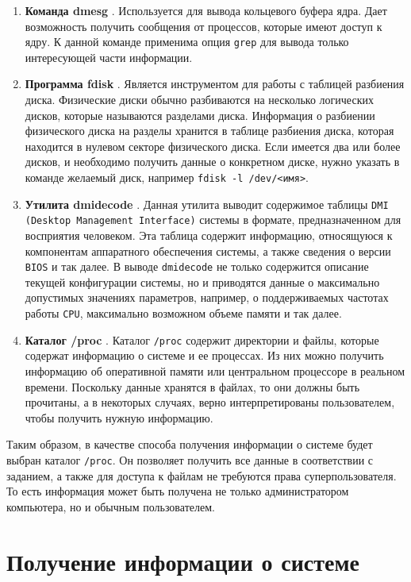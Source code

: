 \begin{enumerate}
    \item \textbf{Команда dmesg} \cite{dmesg}. Используется для вывода кольцевого буфера ядра. Дает возможность получить сообщения от процессов, которые имеют доступ к ядру. К данной команде применима опция \texttt{grep} для вывода только интересующей части информации.
    \item \textbf{Программа fdisk} \cite{fdisk}. Является инструментом для работы с таблицей разбиения диска. Физические диски обычно разбиваются на несколько логических дисков, которые называются разделами диска. Информация о разбиении физического диска на разделы хранится в таблице разбиения диска, которая находится в нулевом секторе физического диска. Если имеется два или более дисков, и необходимо получить данные о конкретном диске, нужно указать в команде желаемый диск, например \texttt{fdisk -l /dev/<имя>}.
    \item \textbf{Утилита dmidecode} \cite{dmidecode}. Данная утилита выводит содержимое таблицы \texttt{DMI (Desktop Management Interface)} системы в формате, предназначенном для восприятия человеком. Эта таблица содержит информацию, относящуюся к компонентам аппаратного обеспечения системы, а также сведения о версии \texttt{BIOS} и так далее. В выводе \texttt{dmidecode} не только содержится описание текущей конфигурации системы, но и приводятся данные о максимально допустимых значениях параметров, например, о поддерживаемых частотах работы \texttt{CPU}, максимально возможном объеме памяти и так далее.
    \item \textbf{Каталог /proc} \cite{procfs}. Каталог \texttt{/proc} содержит директории и файлы, которые содержат информацию о системе и ее процессах. Из них можно получить информацию об оперативной памяти или центральном процессоре в реальном времени. Поскольку данные хранятся в файлах, то они должны быть прочитаны, а в некоторых случаях, верно интерпретированы пользователем, чтобы получить нужную информацию.
\end{enumerate}

Таким образом, в качестве способа получения информации о системе будет выбран каталог \texttt{/proc}. Он позволяет получить все данные в соответствии с заданием, а также для доступа к файлам не требуются права суперпользователя. То есть информация может быть получена не только администратором компьютера, но и обычным пользователем.


\section{Получение информации о системе}

